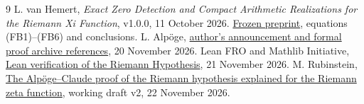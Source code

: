 \documentclass[11pt]{article}
\begin{document}
\begin{thebibliography}{9}
 L. van Hemert, \emph{Exact Zero Detection and Compact Arithmetic Realizations for the Riemann Xi Function}, v1.0.0, 11 October 2026. \href{https://doi.org/10.5281/zenodo.23295277}{Frozen preprint}, equations (FB1)--(FB6) and conclusions.
 L. Alp\"oge, \href{https://alpo.ge/remark.pdf}{author's announcement and formal proof archive references}, 20 November 2026.
 Lean FRO and Mathlib Initiative, \href{https://leanprover-community.github.io/blog/posts/riemann-hypothesis/}{Lean verification of the Riemann Hypothesis}, 21 November 2026.
 M. Rubinstein, \href{https://www.math.uwaterloo.ca/~mrubinst/alpoge_claude_grh/zeta-paper_v2.pdf}{The Alp\"oge--Claude proof of the Riemann hypothesis explained for the Riemann zeta function}, working draft v2, 22 November 2026.
\end{thebibliography}
\end{document}
